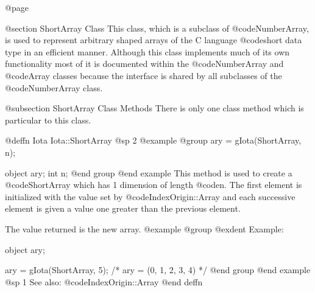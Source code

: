 @page

@section  ShortArray Class
This class, which is a subclass of @code{NumberArray}, is used to
represent arbitrary shaped arrays of the C language @code{short} data
type in an efficient manner.  Although this class implements much of its
own functionality most of it is documented within the @code{NumberArray}
and @code{Array} classes because the interface is shared by all
subclasses of the @code{NumberArray} class.

@subsection ShortArray Class Methods
There is only one class method which is particular to this class.








@deffn {Iota} Iota::ShortArray
@sp 2
@example
@group
ary = gIota(ShortArray, n);

object    ary;
int       n;
@end group
@end example
This method is used to create a @code{ShortArray} which has 1 dimension
of length @code{n}.  The first element is initialized with the value
set by @code{IndexOrigin::Array} and each successive element is given
a value one greater than the previous element.

The value returned is the new array.
@example
@group
@exdent Example:

object  ary;

ary = gIota(ShortArray, 5);
/*  ary = (0, 1, 2, 3, 4)  */
@end group
@end example
@sp 1
See also:  @code{IndexOrigin::Array}
@end deffn








